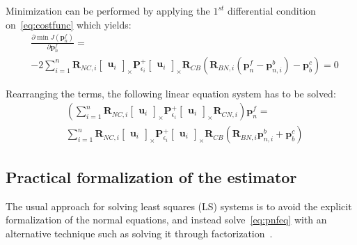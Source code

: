 Minimization can be performed by applying the $1^{st}$ differential condition on~\eqref{eq:costfunc} which yields:
\begin{equation}
\begin{aligned}
    & \frac{\partial\min J(\mathbf{p}_n^f)}{\partial\mathbf{p}_n^f} = \\ & -2\sum_{i=1}^n\mathbf{R}_{NC, i}\begin{bmatrix}
        \mathbf{u}_i
    \end{bmatrix}_\times \mathbf{P}_{\epsilon_i}^{+}\begin{bmatrix}
        \mathbf{u}_i
    \end{bmatrix}_\times \mathbf{R}_{CB}(\mathbf{R}_{BN, i}(\mathbf{p}_n^f-\mathbf{p}_{n, i}^b)-\mathbf{p}_b^c) = 0
\end{aligned}
\end{equation}

Rearranging the terms, the following linear equation system has to be solved:
\begin{equation}
\begin{aligned}
    & \left( \sum_{i=1}^n \mathbf{R}_{NC, i}\begin{bmatrix}
        \mathbf{u}_i
    \end{bmatrix}_\times \mathbf{P}_{\epsilon_i}^{+} \begin{bmatrix}
        \mathbf{u}_i
    \end{bmatrix}_\times \mathbf{R}_{CN, i} \right)\mathbf{p}_n^f = \\ & \sum_{i=1}^n \mathbf{R}_{NC, i} \begin{bmatrix}
        \mathbf{u}_i
    \end{bmatrix}_\times \mathbf{P}_{\epsilon_i}^{+} \begin{bmatrix}
        \mathbf{u}_i
    \end{bmatrix}_\times
    \mathbf{R}_{CB}(\mathbf{R}_{BN, i} \mathbf{p}_{n, i}^b + \mathbf{p}_b^c)
\end{aligned}
\label{eq:pnfeq}
\end{equation}

\subsection{Practical formalization of the estimator}

The usual approach for solving least squares (LS) systems is to avoid the explicit formalization of the normal equations, and instead solve~\eqref{eq:pnfeq} with an alternative technique such as solving it through factorization~\cite{matrixcomputations}. 

